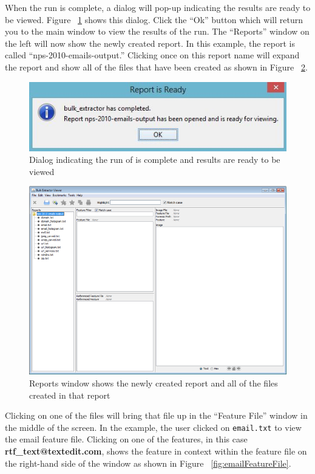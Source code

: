 \documentclass[11pt]{article} %
\begin{document}
When the run is complete, a dialog will pop-up indicating the results are ready to be viewed. Figure ~\ref{fig:reportIsReady} shows this dialog. Click the ``Ok'' button which will return you to the main \viewer window to view the results of the run. The ``Reports'' window on the left will now show the newly created report. In this example, the report is called ``nps-2010-emails-output.'' Clicking once on this report name will expand the report and show all of the files that have been created as shown in Figure ~\ref{fig:listOfOutput}. \\
\begingroup
\center
\begin{figure}
	\includegraphics{viewerPics/reportIsReady.png}
	\caption{Dialog indicating the run of \bulk is complete and results are ready to be viewed}
	\label{fig:reportIsReady}
\end{figure}
\endgroup
\begin{figure}
	\includegraphics[scale=.8]{viewerPics/listOfOutput.png}
	\caption{Reports window shows the newly created report and all of the files created in that report}
	\label{fig:listOfOutput}
\end{figure}
Clicking on one of the files will bring that file up in the ``Feature File'' window in the middle of the screen. In the example, the user clicked on \texttt{email.txt} to view the email feature file. Clicking on one of the features, in this case \textbf{rtf\_text@textedit.com}, shows the feature in context within the feature file on the right-hand side of the window as shown in Figure ~\ref{fig:emailFeatureFile}.\\
\end{document}
